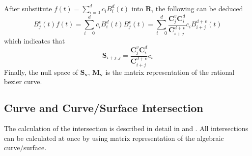     \paragraph{}
After substitute $f(t) = \sum_{i=0}^dc_iB_i^d(t)$ into $\mathbf{R}$, the following can be deduced
    \begin{equation}
        B_j^v(t)f(t) =  \sum_{i=0}^dc_iB_i^d(t)B_j^v(t) =\sum_{i=0}^d \frac{\mathbf{C}^v_j\mathbf{C}^d_i}{\mathbf{C}^{d+v}_{i+j}}c_i B_{i+j}^{d+v}(t)
    \end{equation}
which indicates that
    \begin{equation}
        \mathbf{S}_{i+j,j} = \frac{\mathbf{C}^v_j\mathbf{C}^d_i}{\mathbf{C}^{d+v}_{i+j}}c_i
    \end{equation}
Finally, the null space of $\mathbf{S_v}$, $\mathbf{M_v}$ is the matrix representation of the rational bezier curve.
\pagebreak


\subsection{Curve and Curve/Surface Intersection}
The calculation of the intersection is described in detail in \cite{Buse2010} and \cite{Ba2009}.
All intersections can be calculated at once by using matrix representation of the algebraic curve/surface.

